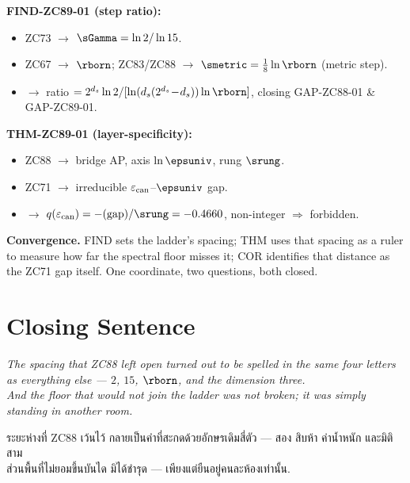 \documentclass[12pt, a4paper]{article}
\renewcommand{\epscan}{\varepsilon_{\rm can}}   %
\begin{document}
\begin{genealogybox}[title={How ZC89's Results Trace Back}]
\textbf{FIND-ZC89-01 (step ratio):}
\begin{itemize}[leftmargin=2em, noitemsep]
  \item ZC73 $\to$ $\sGamma=\ln2/\ln15$.
  \item ZC67 $\to$ $\rborn$; ZC83/ZC88 $\to$ $\smetric=\tfrac18\ln\rborn$ (metric step).
  \item $\to$ ratio $=2^{d_s}\ln2/[\ln(d_s(2^{d_s}\!-\!d_s))\ln\rborn]$, closing GAP-ZC88-01 \& GAP-ZC89-01.
\end{itemize}
\textbf{THM-ZC89-01 (layer-specificity):}
\begin{itemize}[leftmargin=2em, noitemsep]
  \item ZC88 $\to$ bridge AP, axis $\ln\epsuniv$, rung $\srung$.
  \item ZC71 $\to$ irreducible $\epscan$--$\epsuniv$ gap.
  \item $\to$ $q(\epscan)=-(\text{gap})/\srung=-0.4660$, non-integer
    $\Rightarrow$ forbidden.
\end{itemize}
\textbf{Convergence.} FIND sets the ladder's spacing; THM uses that spacing
as a ruler to measure how far the spectral floor misses it; COR identifies
that distance as the ZC71 gap itself. One coordinate, two questions, both
closed.
\end{genealogybox}

\section{Closing Sentence}

\bigskip
\begin{center}
\textit{%
  The spacing that ZC88 left open turned out to be spelled in the same four
  letters as everything else --- $2$, $15$, $\rborn$, and the dimension
  three.\\[0.3em]
  And the floor that would not join the ladder was not broken; it was
  simply standing in another room.
}

\medskip
{\thaifont
ระยะห่างที่ ZC88 เว้นไว้ กลายเป็นคำที่สะกดด้วยอักษรเดิมสี่ตัว ---
สอง สิบห้า ค่าน้ำหนัก และมิติสาม\\
ส่วนพื้นที่ไม่ยอมขึ้นบันได มิได้ชำรุด --- เพียงแต่ยืนอยู่คนละห้องเท่านั้น.}
\end{center}
\end{document}
